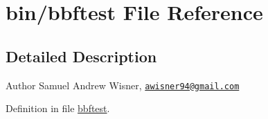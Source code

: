 \hypertarget{bbftest}{\section{bin/bbftest File Reference}
\label{bbftest}
}


\subsection{Detailed Description}
\begin{DoxyAuthor}{Author}
Samuel Andrew Wisner, \href{mailto:awisner94@gmail.com}{\tt awisner94@gmail.\+com} 
\end{DoxyAuthor}


Definition in file \hyperlink{bbftest_source}{bbftest}.

